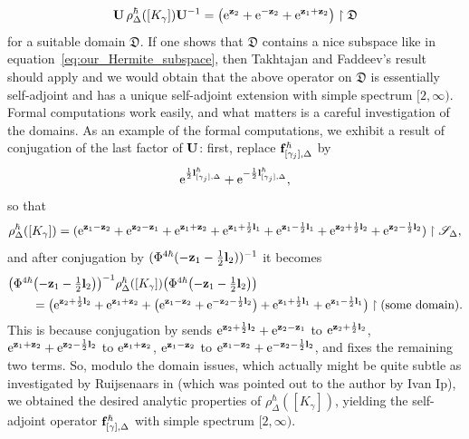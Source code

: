 \documentclass[pdftex]{sigma}
\numberwithin{equation}{section}
\theoremstyle{definition}
\begin{document}
\[
{\bf U} \, \rho^\hbar_\Delta([K_\gamma]) {\bf U}^{-1} = \bigl( {\rm e}^{ {\bf z}_2 } + {\rm e}^{ - {\bf z}_2 } + {\rm e}^{{\bf z}_1 + {\bf z}_2}\bigr) \restriction \mathfrak{D}
\]
for a suitable domain $\mathfrak{D}$. If one shows that $\mathfrak{D}$ contains a nice subspace like in equation~\eqref{eq:our_Hermite_subspace}, then Takhtajan and Faddeev's result \cite{FT} should apply and we would obtain that the above operator on $\mathfrak{D}$ is essentially self-adjoint and has a unique self-adjoint extension with simple spectrum $[2,\infty)$. Formal computations work easily, and what matters is a careful investigation of the domains. As an example of the formal computations, we exhibit a result of conjugation of the last factor of ${\bf U}$: first, replace ${\bf f}^\hbar_{[\gamma_j],\Delta}$ by
\[
{\rm e}^{ \frac{1}{2} {\bf l}^\hbar_{[\gamma_j],\Delta}} + {\rm e}^{ - \frac{1}{2} {\bf l}^\hbar_{[\gamma_j],\Delta}},
\]
 so that
\[
\rho^\hbar_\Delta([K_\gamma])
= ( {\rm e}^{ {\bf z}_1 - {\bf z}_2 } + {\rm e}^{{\bf z}_2 - {\bf z}_1} + {\rm e}^{{\bf z}_1 + {\bf z}_2} + {\rm e}^{{\bf z}_1 + \frac{1}{2} {\bf l}_1} + {\rm e}^{{\bf z}_1 - \frac{1}{2} {\bf l}_1} + {\rm e}^{{\bf z}_2 + \frac{1}{2} {\bf l}_2} + {\rm e}^{{\bf z}_2 - \frac{1}{2} {\bf l}_2} )\restriction \mathscr{S}_\Delta,
\]
and after conjugation by $(\Phi^{4\hbar}(- {\bf z}_1 - \frac{1}{2} {\bf l}_2))^{-1}$ it becomes
\begin{align*}
& \textstyle \bigl(\Phi^{4\hbar}\bigl(- {\bf z}_1 - \tfrac{1}{2} {\bf l}_2\bigr)\bigr)^{-1} \rho^\hbar_\Delta([K_\gamma]) \bigl(\Phi^{4\hbar}\bigl(- {\bf z}_1 - \tfrac{1}{2} {\bf l}_2\bigr)\bigr) \\
& \qquad{}= \bigl({\rm e}^{{\bf z}_2 + \frac{1}{2} {\bf l}_2} + {\rm e}^{{\bf z}_1+{\bf z}_2} + \bigl({\rm e}^{{\bf z}_1-{\bf z}_2} + {\rm e}^{-{\bf z}_2 - \frac{1}{2} {\bf l}_2}\bigr)
+ {\rm e}^{{\bf z}_1 + \frac{1}{2} {\bf l}_1} + {\rm e}^{{\bf z}_1 - \frac{1}{2} {\bf l}_1}\bigr)\restriction{\mbox{(some domain)}}.
\end{align*}
This is because conjugation by  sends ${\rm e}^{{\bf z}_2 + \frac{1}{2} {\bf l}_2} + {\rm e}^{{\bf z}_2 - {\bf z}_1}$ to ${\rm e}^{{\bf z}_2 + \frac{1}{2} {\bf l}_2}$, ${\rm e}^{{\bf z}_1 + {\bf z}_2} + {\rm e}^{{\bf z}_2 - \frac{1}{2} {\bf l}_2}$ to ${\rm e}^{{\bf z}_1+{\bf z}_2}$, ${\rm e}^{{\bf z}_1-{\bf z}_2}$ to ${\rm e}^{{\bf z}_1 - {\bf z}_2} + {\rm e}^{-{\bf z}_2 - \frac{1}{2} {\bf l}_2}$, and fixes the remaining two terms. So, modulo the domain issues, which actually might be quite subtle as investigated by Ruijsenaars in \cite{Ruijsenaars} (which was pointed out to the author by Ivan Ip), we obtained the desired analytic properties of $\rho^\hbar_\Delta([K_\gamma])$, yielding the self-adjoint operator ${\bf f}^\hbar_{[\gamma],\Delta}$ with simple spectrum $[2,\infty)$.
\end{document}
